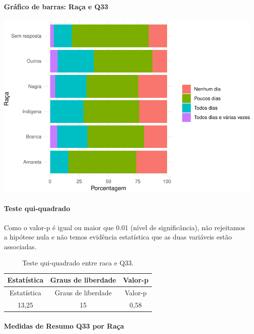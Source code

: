 \documentclass[]{article}
\let\oldparagraph\paragraph
\renewcommand{\paragraph}[1]{\oldparagraph{#1}\mbox{}}
\begin{document}
\hypertarget{gruxe1fico-de-barras-rauxe7a-e-q33}{%
\paragraph{Gráfico de barras: Raça e Q33}\label{gruxe1fico-de-barras-rauxe7a-e-q33}}

\begin{center}\includegraphics[width=0.75\linewidth]{relatorio_covid19_files/figure-latex/unnamed-chunk-1165-1} \end{center}

\hypertarget{teste-qui-quadrado-100}{%
\paragraph{Teste qui-quadrado}\label{teste-qui-quadrado-100}}

Como o valor-p é igual ou maior que 0.01 (nível de significância), não rejeitamos a hipótese nula e não temos evidência estatística que as duas variáveis estão associadas.

\begin{longtable}[]{@{}ccc@{}}
\caption{\label{tab:unnamed-chunk-1167}Teste qui-quadrado entre raca e Q33.}\tabularnewline
\toprule
Estatística & Graus de liberdade & Valor-p\tabularnewline
\midrule
\endfirsthead
\toprule
Estatística & Graus de liberdade & Valor-p\tabularnewline
\midrule
\endhead
13,25 & 15 & 0,58\tabularnewline
\bottomrule
\end{longtable}

\cleardoublepage

\hypertarget{medidas-de-resumo-q33-por-rauxe7a}{%
\paragraph{Medidas de Resumo Q33 por Raça}\label{medidas-de-resumo-q33-por-rauxe7a}}
\end{document}
